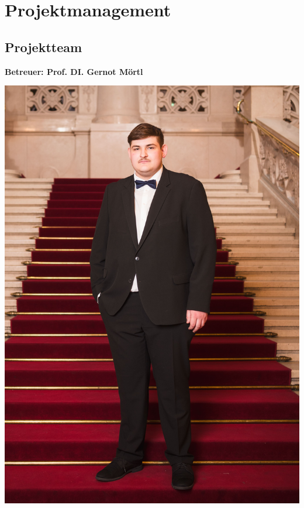 \documentclass[ngerman,12pt,a4paper]{article}
\begin{document}
	\section{Projektmanagement}
	
		\subsection{Projektteam} %
		\vspace{-10pt}
		\begin{center}
		\textbf{Betreuer: Prof. DI. Gernot Mörtl}\\[1cm]
			\begin{minipage}{0.18\textwidth}
				\includegraphics[width=\linewidth]{Pictures/daniel}
				\label{fig:daniel}

\end{minipage}
\end{center}
\end{document}
